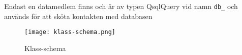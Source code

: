 Endast en datamedlem finns och är av typen QsqlQuery vid namn \verb+db_+ och
används för att sköta kontakten med databasen





\begin{figure}[h]
\centering
\texttt{[image: klass-schema.png]}
\caption{Klass-schema}
\label{fig:classes}
\end{figure}


